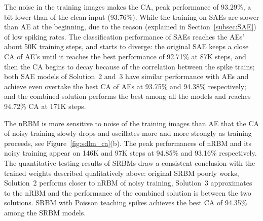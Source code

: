 The noise in the training images makes the CA, peak performance of 93.29\%, a bit lower than of the clean input (93.76\%).
While the training on SAEs are slower than AE at the beginning, due to the reason (explained in Section~\ref{subsec:SAE}) of low spiking rates.
The classification performance of SAEs reaches the AEs' about 50K training steps, and starts to diverge:
the original SAE keeps a close CA of AE's until it reaches the best performance of 92.71\% at 87K steps, and then the CA begins to decay because of the correlation between the spike trains;
both SAE models of Solution~2 and~3 have similar performance with AEs and achieve even overtake the best CA of AEs at 93.75\% and 94.38\% respectively;
and the combined solution performs the best among all the models and reaches 94.72\% CA at 171K steps.

The nRBM is more sensitive to noise of the training images than AE that the CA of noisy training slowly drops and oscillates more and more strongly as training proceeds, see Figure~\ref{fig:sdlm_ca}(b).
The peak performances of nRBM and its noisy training appear on 146K and 97K steps at 94.85\% and 93.16\% respectively. 
The quantitative testing results of SRBMs draw a consistent conclusion with the trained weights described qualitatively above:
original SRBM poorly works, Solution~2 performs closer to nRBM of noisy training, Solution~3 approximates to the nRBM and the performance of the combined solution is between the two solutions.
SRBM with Poisson teaching spikes achieves the best CA of 94.35\% among the SRBM models.

